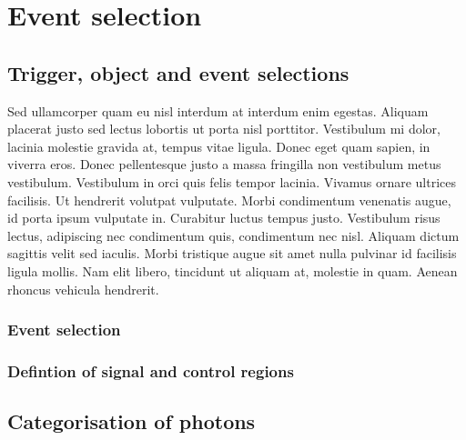 \chapter{Event selection}
\label{chap:event_selection}

\section{Trigger, object and event selections}
\label{sec:trigger-object-event-selection}

Sed ullamcorper quam eu nisl interdum at interdum enim egestas. Aliquam placerat justo sed lectus lobortis ut porta nisl porttitor. Vestibulum mi dolor, lacinia molestie gravida at, tempus vitae ligula. Donec eget quam sapien, in viverra eros. Donec pellentesque justo a massa fringilla non vestibulum metus vestibulum. Vestibulum in orci quis felis tempor lacinia. Vivamus ornare ultrices facilisis. Ut hendrerit volutpat vulputate. Morbi condimentum venenatis augue, id porta ipsum vulputate in. Curabitur luctus tempus justo. Vestibulum risus lectus, adipiscing nec condimentum quis, condimentum nec nisl. Aliquam dictum sagittis velit sed iaculis. Morbi tristique augue sit amet nulla pulvinar id facilisis ligula mollis. Nam elit libero, tincidunt ut aliquam at, molestie in quam. Aenean rhoncus vehicula hendrerit.

\subsection{Event selection}
\label{sec:event-selection}

\subsection{Defintion of signal and control regions}
\label{sec:signal-control-regions}

\section{Categorisation of photons}
\label{sec:photon-categorisation}

